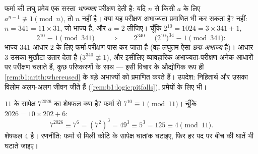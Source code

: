 \begin{example}[फर्मा का विलोम विफल है: $341$]\label{ex:b1:arith:pseudoprime}
फर्मा की लघु प्रमेय एक सस्ता \emph{भाज्यता} परीक्षण देती है: यदि $n$ से
 किसी $a$ के लिए $a^{n-1} \not\equiv 1 \pmod n$, तो $n$  नहीं
है। क्या यह परीक्षण अभाज्यता प्रमाणित भी कर सकता है? नहीं: $n = 341 = 11
\times 31$, जो भाज्य है, और $a = 2$ लीजिए। चूँकि $2^{10} = 1024 = 3 \times
341 + 1$,
\[
2^{10} \equiv 1 \pmod{341}
\qquad\Longrightarrow\qquad
2^{340} = \bigl(2^{10}\bigr)^{34} \equiv 1 \pmod{341} :
\]
भाज्य $341$ आधार $2$ के लिए फर्मा-परीक्षण पास कर जाता है (वह लघुतम ऐसा
\emph{छद्म-अभाज्य} है)। आधार $3$ उसका मुखौटा उतार देता है ($3^{340}
\not\equiv 1$), और इसीलिए व्यावहारिक अभाज्यता-परीक्षण अनेक आधारों पर परीक्षण
चलाते हैं, कुछ परिष्करणों के साथ --- इसी विचार के औद्योगिक रूप ही
\cref{rem:b1:arith:whereused} के बड़े अभाज्यों को प्रमाणित करते हैं। उपदेश:
निहितार्थ और उसका विलोम अलग-अलग जीवन जीते हैं
(\cref{rem:b1:logic:pitfalls}), प्रमेयों के लिए भी।
\end{example}

\begin{example}\label{ex:b1:arith:congruences}
$11$ के सापेक्ष $7^{2026}$ का शेषफल क्या है? फर्मा से $7^{10} \equiv 1
\pmod{11}$। चूँकि $2026 = 10 \times 202 + 6$:
\[
7^{2026} \equiv 7^6 = (7^2)^3 = 49^3 \equiv 5^3 = 125 \equiv 4
\pmod{11}.
\]
शेषफल $4$ है। रणनीति: फर्मा से मिली कोटि के सापेक्ष घातांक घटाइए, फिर हर पद
पर बीच की घातें भी घटाते जाइए।
\end{example}


